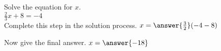 \documentclass{ximera}
\author{David Kish}
\begin{document}
\begin{exercise}
Solve the equation for $x$.\\
$\frac{2}{3}x+8 = -4$\\

Complete this step in the solution process.
$x=\answer{\frac{3}{2}}(-4-8)$

Now give the final answer.
$x=\answer{-18}$
\end{exercise}
\end{document}
